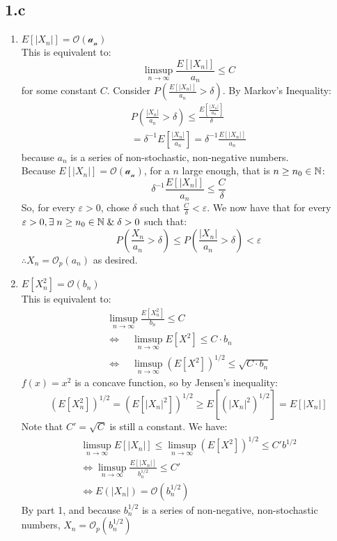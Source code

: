 \subsection{1.c}
\begin{enumerate}
    \item \(E[|X_n|]=\mathcal{O(a_n)}\) \\
    This is equivalent to: 
    \[
    \limsup_{n\rightarrow\infty} \frac{E[|X_n|]}{a_n} \leq C
    \]
    for some constant \(C\).  Consider \(P(\frac{E[|X_n|]}{a_n}> \delta)\).  By Markov's Inequality:
    \begin{align*}
        P(\frac{|X_n|}{a_n}> \delta) \leq \frac{E\left [\frac{|X_n|}{a_n}\right ]}{\delta} \\
        =\delta^{-1}E\left [\frac{|X_n|}{a_n}\right ] = \delta^{-1}\frac{E[|X_n|]}{a_n}
    \end{align*}
    because \(a_n\) is a series of non-stochastic, non-negative numbers. \\
    Because \(E[|X_n|]=\mathcal{O(a_n)}\), for a $n$ large enough, that is \(n\geq n_0 \in {\Bbb N}\):
    \[
    \delta^{-1}\frac{E[|X_n|]}{a_n} \leq \frac{C}{\delta}
    \]
    So, for every \(\varepsilon>0\), chose $\delta$ such that \(\frac{C}{\delta}<\varepsilon\).  We now have that for every \(\varepsilon>0, \exists \;n\geq n_0 \in {\Bbb N}\;\&\; \delta>0 \) such that:
    \[
    P \left (\frac{X_n}{a_n} > \delta \right) \leq P \left (\frac{|X_n|}{a_n}> \delta\right ) <\varepsilon
    \]
    \(\therefore X_n =\mathcal{O}_p(a_n)\) as desired.
    \item \(E[X_n^2]=\mathcal{O}{(b_n)}\) \\
    This is equivalent to: 
    \begin{align*}
        \limsup_{n\rightarrow\infty} \frac{E[X_n^2]}{b_n} \leq C  \nonumber\\
        \Leftrightarrow \quad \limsup_{n\rightarrow\infty} E[X^2] \leq C \cdot b_n \nonumber \\
        \Leftrightarrow \quad \limsup_{n\rightarrow\infty} (E[X^2])^{1/2} \leq \sqrt{C \cdot b_n} 
    \end{align*}
    \(f(x) = x^2\) is a concave function, so by Jensen's inequality:
    \[
    (E[X_n^2])^{1/2} = (E[|X_n|^2])^{1/2} \geq E[(|X_n|^2)^{1/2}] = E[|X_n|]
    \]
    Note that \(C' = \sqrt{C}\) is still a constant.  We have:
    \begin{align*}
         \limsup_{n\rightarrow\infty}E[|X_n|] \leq \limsup_{n\rightarrow\infty} (E[X^2])^{1/2} \leq C'b^{1/2} \\
         \Leftrightarrow \limsup_{n\rightarrow\infty} \frac{E[|X_n|]}{b_n^{1/2}} \leq C' \\
         \Leftrightarrow E(|X_n|) = \mathcal{O}(b_n^{1/2})
    \end{align*}
    By part 1, and because \(b_n^{1/2}\) is a series of non-negative, non-stochastic numbers, \(X_n=\mathcal{O}_p(b_n^{1/2})\)
\end{enumerate}